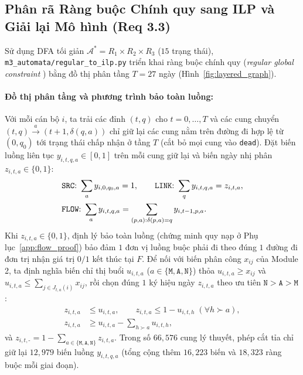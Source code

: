 \subsection{Phân rã Ràng buộc Chính quy sang ILP và Giải lại Mô hình (Req 3.3)}
\label{sec:m3_ilp}

Sử dụng DFA tối giản $\mathcal{A}^* = R_1 \times R_2 \times R_3$ ($15$ trạng thái), \texttt{m3\_\allowbreak automata/\allowbreak regular\_\allowbreak to\_\allowbreak ilp.py} triển khai ràng buộc chính quy (\textit{regular global constraint} \cite{pesant2004,cote2011}) bằng đồ thị phân tầng $T = 27$ ngày (Hình~\ref{fig:layered_graph}).

\paragraph*{Đồ thị phân tầng và phương trình bảo toàn luồng:}
Với mỗi cán bộ $i$, ta trải các đỉnh $(t, q)$ cho $t = 0, \dots, T$ và các cung chuyển $(t, q) \xrightarrow{a} (t+1, \delta(q, a))$ chỉ giữ lại các cung nằm trên đường đi hợp lệ từ $(0, q_0)$ tới trạng thái chấp nhận ở tầng $T$ (cắt bỏ mọi cung vào \texttt{dead}). Đặt biến luồng liên tục $y_{i, t, q, a} \in [0, 1]$ trên mỗi cung giữ lại và biến ngày nhị phân $z_{i, t, a} \in \{0, 1\}$:
\begin{equation}
\begin{aligned}
    &\text{\texttt{SRC}: } \sum_a y_{i, 0, q_0, a} = 1, \qquad
    \text{\texttt{LINK}: } \sum_q y_{i, t, q, a} = z_{i, t, a}, \\
    &\text{\texttt{FLOW}: } \sum_a y_{i, t, q, a} = \sum_{(p, a): \delta(p, a) = q} y_{i, t-1, p, a}.
\end{aligned}
\end{equation}
Khi $z_{i, t, a} \in \{0, 1\}$, định lý bảo toàn luồng (chứng minh quy nạp ở Phụ lục~\ref{app:flow_proof}) bảo đảm $1$ đơn vị luồng buộc phải đi theo đúng $1$ đường đi đơn trị nhận giá trị $0/1$ kết thúc tại $F$. Để nối với biến phân công $x_{ij}$ của Module 2, ta định nghĩa biến chỉ thị buổi $u_{i, t, a}$ ($a \in \{\texttt{M}, \texttt{A}, \texttt{N}\}$) thỏa $u_{i, t, a} \ge x_{ij}$ và $u_{i, t, a} \le \sum_{j \in J_{t,a}(i)} x_{ij}$, rồi chọn đúng $1$ ký hiệu ngày $z_{i, t, a}$ theo ưu tiên $\texttt{N} > \texttt{A} > \texttt{M}$:
\begin{equation}
\begin{aligned}
    z_{i, t, a} &\le u_{i, t, a}, \qquad z_{i, t, a} \le 1 - u_{i, t, h} \; (\forall h \succ a), \\
    z_{i, t, a} &\ge u_{i, t, a} - \sum_{h \succ a} u_{i, t, h},
\end{aligned}
\end{equation}
và $z_{i, t, \texttt{-}} = 1 - \sum_{a \in \{\texttt{M},\texttt{A},\texttt{N}\}} z_{i, t, a}$. Trong số $66{,}576$ cung lý thuyết, phép cắt tỉa chỉ giữ lại $12{,}979$ biến luồng $y_{i,t,q,a}$ (tổng cộng thêm $16{,}223$ biến và $18{,}323$ ràng buộc mỗi giai đoạn).

